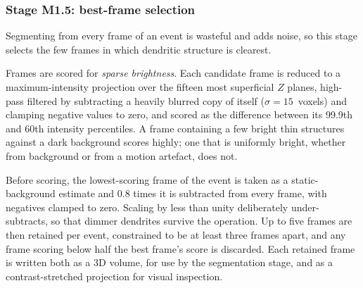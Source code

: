 

		\subsubsection{Stage M1.5: best-frame selection}

			Segmenting from every frame of an event is wasteful and adds noise,
			so this stage selects the few frames in which dendritic structure is
			clearest.

			Frames are scored for \emph{sparse brightness}.
			Each candidate frame is reduced to a maximum-intensity projection
			over the fifteen most superficial $Z$ planes, high-pass filtered by
			subtracting a heavily blurred copy of itself ($\sigma = 15$~voxels)
			and clamping negative values to zero, and scored as the difference
			between its 99.9th and 60th intensity percentiles.
			A frame containing a few bright thin structures against a dark
			background scores highly; one that is uniformly bright, whether from
			background or from a motion artefact, does not.

			Before scoring, the lowest-scoring frame of the event is taken as a
			static-background estimate and $0.8$ times it is subtracted from
			every frame, with negatives clamped to zero.
			Scaling by less than unity deliberately under-subtracts, so that
			dimmer dendrites survive the operation.
			Up to five frames are then retained per event, constrained to be at
			least three frames apart, and any frame scoring below half the best
			frame's score is discarded.
			Each retained frame is written both as a 3D volume, for use by the
			segmentation stage, and as a contrast-stretched projection for visual
			inspection.

